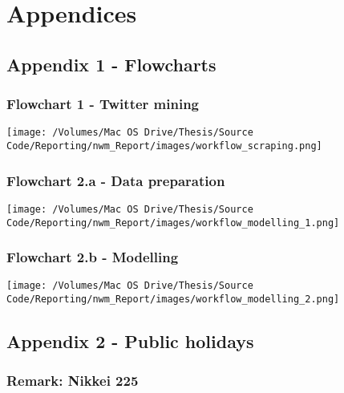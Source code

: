 \documentclass{article}
\begin{document}
\pagebreak


\section{Appendices}
\label{sec-8}



\subsection{Appendix 1 - Flowcharts \label{flowcharts}}
\label{sec-8-1}


\subsubsection{Flowchart 1 - Twitter mining \label{flowchart-twitter-mining} \label{flowchart-scraping}}
\label{sec-8-1-1}

\texttt{[image: /Volumes/Mac OS Drive/Thesis/Source Code/Reporting/nwm\_Report/images/workflow\_scraping.png]}


\subsubsection{Flowchart 2.a - Data preparation \label{flowchart-mod1}}
\label{sec-8-1-2}

\texttt{[image: /Volumes/Mac OS Drive/Thesis/Source Code/Reporting/nwm\_Report/images/workflow\_modelling\_1.png]}


\subsubsection{Flowchart 2.b - Modelling \label{flowchart-mod2}}
\label{sec-8-1-3}
\texttt{[image: /Volumes/Mac OS Drive/Thesis/Source Code/Reporting/nwm\_Report/images/workflow\_modelling\_2.png]}

\pagebreak

\pagebreak


\subsection{Appendix 2 - Public holidays \label{pub-holidays}}
\label{sec-8-2}


\subsubsection{Remark: Nikkei 225}
\label{sec-8-2-1}
\end{document}
